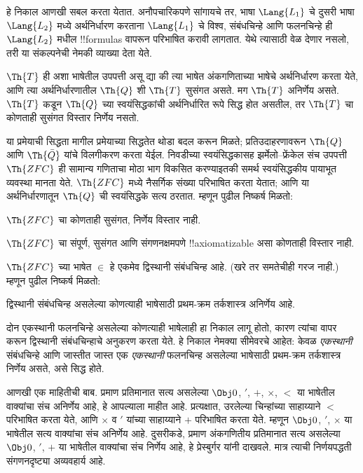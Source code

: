 \documentclass[../../../include/open-logic-section]{subfiles}
\begin{document}


हे निकाल आणखी सबल करता येतात. अनौपचारिकपणे सांगायचे तर,
भाषा $\Lang{L_1}$ चे दुसरी भाषा $\Lang{L_2}$ मध्ये
अर्थनिर्धारण करताना $\Lang{L_1}$ चे विश्व, संबंधचिन्हे आणि
फलनचिन्हे ही $\Lang{L_2}$ मधील !!{formula}s वापरून
परिभाषित करावी लागतात. येथे त्यासाठी वेळ देणार नसलो,
तरी या संकल्पनेची नेमकी व्याख्या देता येते.

\begin{thm}
  $\Th{T}$ ही अशा भाषेतील उपपत्ती असू द्या की त्या भाषेत
  अंकगणिताच्या भाषेचे अर्थनिर्धारण करता येते, आणि त्या
  अर्थनिर्धारणातील $\Th{Q}$ शी $\Th{T}$ सुसंगत असते.
  मग $\Th{T}$ अनिर्णेय असते. $\Th{T}$ कडून $\Th{Q}$ च्या
  स्वयंसिद्धकांची अर्थनिर्धारित रूपे सिद्ध होत असतील, तर
  $\Th{T}$ चा कोणताही सुसंगत विस्तार निर्णेय नसतो.
\end{thm}

या प्रमेयाची सिद्धता मागील प्रमेयाच्या सिद्धतेत थोडा बदल करून
मिळते; प्रतिउदाहरणावरून $\Th{Q}$ आणि $\Th{\bar Q}$ यांचे
विलगीकरण करता येईल. निवडीच्या स्वयंसिद्धकासह
झर्मेलो--फ्रेंकेल संच उपपत्ती $\Th{ZFC}$ ही सामान्य
गणिताचा मोठा भाग विकसित करण्याइतकी समर्थ स्वयंसिद्धकीय
पायाभूत व्यवस्था मानता येते. $\Th{ZFC}$ मध्ये नैसर्गिक
संख्या परिभाषित करता येतात; आणि या अर्थनिर्धारणातून
$\Th{Q}$ ची स्वयंसिद्धके सत्य ठरतात. म्हणून पुढील निष्कर्ष मिळतो:

\begin{cor}
$\Th{ZFC}$ चा कोणताही सुसंगत, निर्णेय विस्तार नाही.
\end{cor}

\begin{cor}
$\Th{ZFC}$ चा संपूर्ण, सुसंगत आणि संगणनक्षमपणे
!!{axiomatizable} असा कोणताही विस्तार नाही.
\end{cor}

$\Th{ZFC}$ च्या भाषेत $\in$ हे एकमेव द्विस्थानी संबंधचिन्ह
आहे. (खरे तर समतेचीही गरज नाही.) म्हणून पुढील निष्कर्ष मिळतो:

\begin{cor}
द्विस्थानी संबंधचिन्ह असलेल्या कोणत्याही भाषेसाठी प्रथम-क्रम
तर्कशास्त्र अनिर्णेय आहे.
\end{cor}

दोन एकस्थानी फलनचिन्हे असलेल्या कोणत्याही भाषेलाही हा निकाल
लागू होतो, कारण त्यांचा वापर करून द्विस्थानी संबंधचिन्हाचे
अनुकरण करता येते. हे निकाल नेमक्या सीमेवरचे आहेत: केवळ
\emph{एकस्थानी} संबंधचिन्हे आणि जास्तीत जास्त एक
\emph{एकस्थानी} फलनचिन्ह असलेल्या भाषेसाठी प्रथम-क्रम
तर्कशास्त्र निर्णेय असते, असे सिद्ध होते.

आणखी एक माहितीची बाब. प्रमाण प्रतिमानात सत्य असलेल्या
$\Obj 0$, $'$, $+$, $\times$, $<$ या भाषेतील वाक्यांचा
संच अनिर्णेय आहे, हे आपल्याला माहीत आहे. प्रत्यक्षात,
उरलेल्या चिन्हांच्या साहाय्याने $<$ परिभाषित करता येते,
आणि $\times$ व $'$ यांच्या साहाय्याने $+$ परिभाषित
करता येते. म्हणून $\Obj 0$, $'$, $\times$ या भाषेतील
सत्य वाक्यांचा संच अनिर्णेय आहे. दुसरीकडे, प्रमाण
अंकगणितीय प्रतिमानात सत्य असलेल्या $\Obj 0$, $'$, $+$
या भाषेतील वाक्यांचा संच निर्णेय आहे, हे प्रेस्बुर्गर यांनी
दाखवले. मात्र त्याची निर्णयपद्धती संगणनदृष्ट्या अव्यवहार्य आहे.
\end{document}
